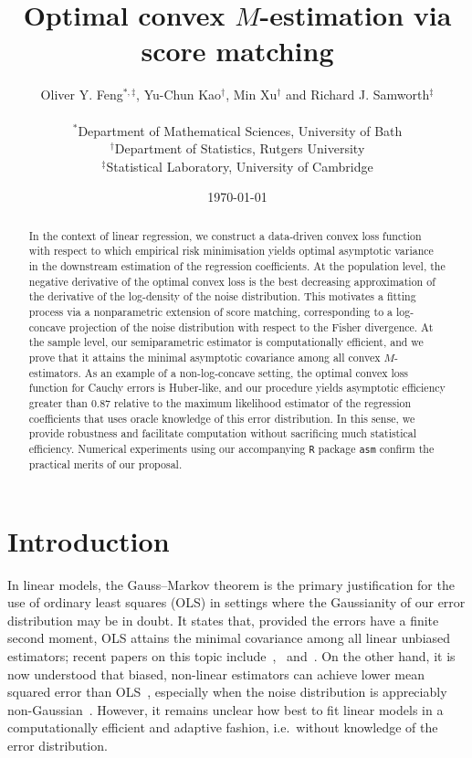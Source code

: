 \documentclass[a4paper]{article}
\title{Optimal convex $M$-estimation via score matching}
\date{\today}
\author{Oliver Y. Feng$^{*,\ddagger}$, Yu-Chun Kao$^\dagger$, Min Xu$^\dagger$ and Richard J. Samworth$^\ddagger$ \\ \\ $^*$Department of Mathematical Sciences, University of Bath \\ $^\dagger$Department of Statistics, Rutgers University \\ $^\ddagger$Statistical Laboratory, University of Cambridge}
\theoremstyle{definition}
\newcommand{\green}[1]{{\color{green!70!black}#1}}
\begin{document}
\maketitle

\begin{abstract}
In the context of linear regression, we construct a data-driven convex loss function with respect to which empirical risk minimisation yields optimal asymptotic variance in the downstream estimation of the regression coefficients.  At the population level, the negative derivative of the optimal convex loss is the best decreasing approximation of the derivative of the log-density of the noise distribution.  This motivates a fitting process via a nonparametric extension of score matching, corresponding to a log-concave projection of the noise distribution with respect to the Fisher divergence.  At the sample level, our semiparametric estimator is computationally efficient, and we prove that it attains the minimal asymptotic covariance among all convex $M$-estimators. As an example of a non-log-concave setting, the optimal convex loss function for Cauchy errors is Huber-like, and our procedure yields asymptotic efficiency greater than $0.87$ relative to the 
maximum likelihood estimator of the regression coefficients that uses oracle knowledge of this error distribution.  In this sense, we provide robustness and facilitate computation without sacrificing much statistical 
efficiency. Numerical experiments using our accompanying \texttt{R} package \texttt{asm} confirm the practical merits of our proposal.
\end{abstract}

\section{Introduction}

In linear models, the Gauss--Markov theorem is the primary justification for the use of ordinary least squares (OLS) in settings where the Gaussianity of our error distribution may be in doubt.  It states that, provided the errors have a finite second moment, OLS attains the minimal covariance among all linear unbiased estimators; recent papers on this topic include~\citet{hansen2022modern},~\citet{potscher2024comment} and~\citet{lei2022estimators}. On the other hand, it is now understood that biased, non-linear estimators can achieve lower mean squared error than OLS~\citep{stein1956inadmissibility,hoerl1970ridge}, especially when the noise distribution is appreciably non-Gaussian~\citep{zou2008composite,dumbgen2011approximation}. However, it remains unclear how best to fit linear models in a computationally efficient and adaptive fashion, i.e.~without knowledge of the error distribution. %
\end{document}
